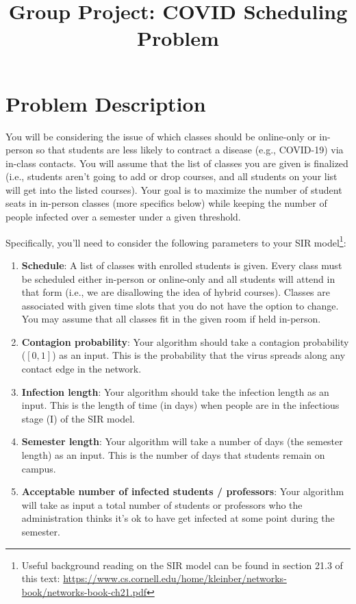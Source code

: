 \documentclass[12pt]{article}
\title{Group Project: COVID Scheduling Problem}
\date{}
\begin{document}
\maketitle

\section{Problem Description}
You will be considering the issue of which classes should be online-only or in-person so that students are less likely to contract a disease (e.g., COVID-19) via in-class contacts.  You will assume that the list of classes you are given is finalized (i.e., students aren't going to add or drop courses, and all students on your list will get into the listed courses).  Your goal is to maximize the number of student seats in in-person classes (more specifics below) while keeping the number of people infected over a semester under a given threshold.

Specifically, you'll need to consider the following parameters to your SIR model\footnote{Useful background reading on the SIR model can be found in section 21.3 of this text: \url{https://www.cs.cornell.edu/home/kleinber/networks-book/networks-book-ch21.pdf}}:
\begin{enumerate}
\item \textbf{Schedule}: A list of classes with enrolled students is given. Every class must be scheduled either in-person or online-only and all students will attend in that form (i.e., we are disallowing the idea of hybrid courses).  Classes are associated with given time slots that you do not have the option to change.  You may assume that all classes fit in the given room if held in-person.
\item \textbf{Contagion probability}: Your algorithm should take a contagion probability ($[0,1]$) as an input.  This is the probability that the virus spreads along any contact edge in the network.
\item \textbf{Infection length}: Your algorithm should take the infection length as an input.  This is the length of time (in days) when people are in the infectious stage (I) of the SIR model.
\item \textbf{Semester length}: Your algorithm will take a number of days (the semester length) as an input.  This is the number of days that students remain on campus.
\item \textbf{Acceptable number of infected students / professors}: Your algorithm will take as input a total number of students or professors who the administration thinks it's ok to have get infected at some point during the semester.
\end{enumerate}
\end{document}
